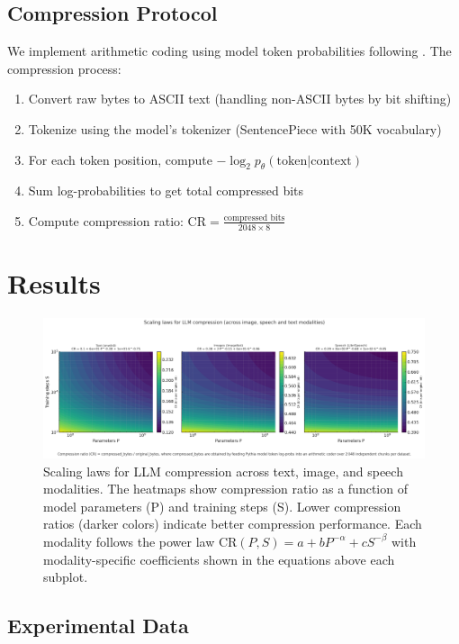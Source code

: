 \documentclass[11pt]{article}
\begin{document}
\subsection{Compression Protocol}

We implement arithmetic coding using model token probabilities following \citet{deletang2023compression}. The compression process:

\begin{enumerate}
\item Convert raw bytes to ASCII text (handling non-ASCII bytes by bit shifting)
\item Tokenize using the model's tokenizer (SentencePiece with 50K vocabulary)
\item For each token position, compute $-\log_2 p_\theta(\text{token}|\text{context})$
\item Sum log-probabilities to get total compressed bits
\item Compute compression ratio: $\mathrm{CR} = \frac{\text{compressed bits}}{2048 \times 8}$
\end{enumerate}

\section{Results}

\begin{figure}[!htbp]
\centering
\includegraphics[width=1.1\textwidth]{scaling_laws_for_compression.png}
\caption{Scaling laws for LLM compression across text, image, and speech modalities. The heatmaps show compression ratio as a function of model parameters (P) and training steps (S). Lower compression ratios (darker colors) indicate better compression performance. Each modality follows the power law $\mathrm{CR}(P,S) = a + bP^{-\alpha} + cS^{-\beta}$ with modality-specific coefficients shown in the equations above each subplot.}
\label{fig:scaling_laws}
\end{figure}

\subsection{Experimental Data}
\end{document}
